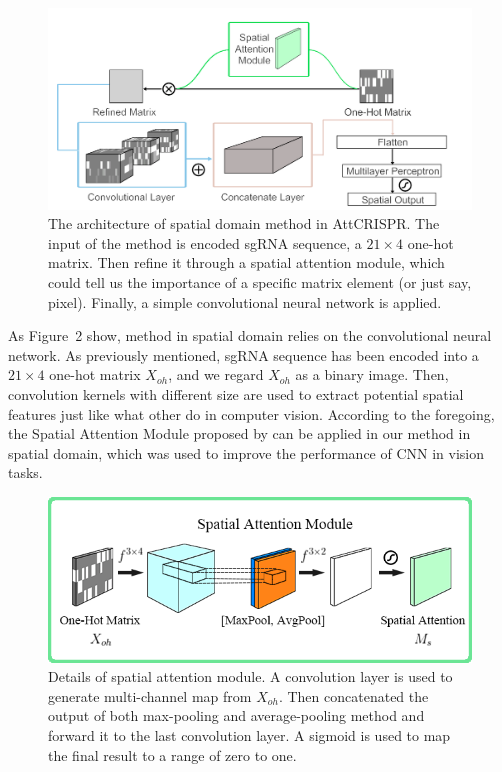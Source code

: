 \documentclass{bioinfo}
\begin{document}
\begin{figure}[!tpb]%
    \centerline{\includegraphics[scale=0.15]{CNNv2.png}}
    \caption{The architecture of spatial domain method in AttCRISPR. 
    The input of the method is encoded sgRNA sequence, a $21\times 4$ one-hot matrix. 
    Then refine it through a spatial attention module, which could tell us the importance of a specific matrix element (or just say, pixel).
    Finally, a simple convolutional neural network is applied.}\label{fig:02}
\end{figure}
As Figure~2\vphantom{\ref{fig:02}} show, method in spatial domain relies on the convolutional neural network. 
As previously mentioned, sgRNA sequence has been encoded into a $21\times 4$ one-hot matrix $X_{oh}$, and we regard $X_{oh}$ as a binary image. 
Then, convolution kernels with different size are used to extract potential spatial features just like what other do in computer vision. 
According to the foregoing, the Spatial Attention Module proposed by \citeauthor{woo2018cbam:} can be applied in our method in spatial domain, 
which was used to improve the performance of CNN in vision tasks.

\begin{figure}[!tpb]%
    \centerline{\includegraphics[scale=0.37]{spatialmodule.png}}
    \caption{Details of spatial attention module. A convolution layer is used to generate multi-channel map from $X_{oh}$.
    Then concatenated the output of both max-pooling and average-pooling method and forward it to the last convolution layer.
    A sigmoid is used to map the final result to a range of zero to one.
    }\label{fig:03}
\end{figure}
\end{document}
